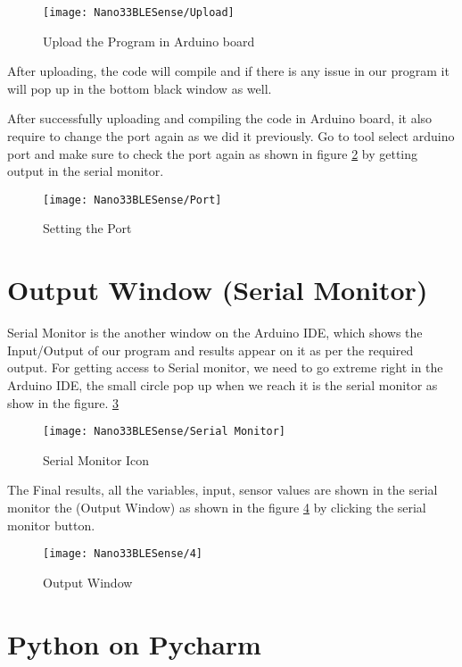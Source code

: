 \begin{figure}[h]
	\centering
	\texttt{[image: Nano33BLESense/Upload]}
	\caption{Upload the Program in Arduino board}
	\label{fig:Upload}
\end{figure}

After uploading, the code will compile and if there is any issue in our program it will pop up in the bottom black window as well.

After successfully uploading and compiling the code in Arduino board, it also require to change the port again as we did it previously. Go to tool select arduino port and make sure to check the port again as shown in figure \ref{fig:Port} by getting output in the serial monitor.

\begin{figure}[h]
	\centering
	\texttt{[image: Nano33BLESense/Port]}
	\caption{Setting the Port}
	\label{fig:Port}
\end{figure}

\section{Output Window (Serial Monitor)}

Serial Monitor is the another window on the Arduino IDE, which shows the Input/Output of our program and results appear on it as per the required output. For getting access to Serial monitor, we need to go extreme right in the Arduino IDE, the small circle pop up when we reach it is the serial monitor as show in the figure. \ref{fig:Serial Monitor}

\begin{figure}[h]
	\centering
	\texttt{[image: Nano33BLESense/Serial Monitor]}
	\caption{Serial Monitor Icon}
	\label{fig:Serial Monitor}
\end{figure}

The Final results, all the variables, input, sensor values are shown in the serial monitor the (Output Window)  as shown in the figure \ref{fig:Output Window} by clicking the serial monitor button.

\begin{figure}[h]
	\centering
	\texttt{[image: Nano33BLESense/4]}
	\caption{Output Window}
	\label{fig:Output Window}
\end{figure}

\section{Python on Pycharm}

